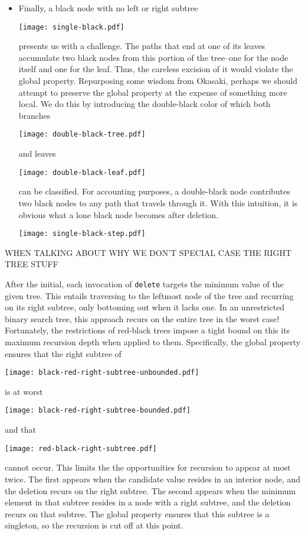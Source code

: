 \documentclass[preprint]{sigplanconf}
\begin{document}
\begin{itemize}
\item Finally, a black node with no left or right subtree
\begin{center}
\texttt{[image: single-black.pdf]}
\end{center}
presents us with a challenge. The paths that end at one of its leaves accumulate two black nodes from this portion of the tree--one for the node itself and one for the leaf. Thus, the careless excision of it would violate the global property. Repurposing some wisdom from Okasaki, perhaps we should attempt to preserve the global property at the expense of something more local. We do this by introducing the double-black color of which both branches
\begin{center}
\texttt{[image: double-black-tree.pdf]}
\end{center}
and leaves
\begin{center}
\texttt{[image: double-black-leaf.pdf]}
\end{center}
can be classified. For accounting purposes, a double-black node contributes two black nodes to any path that travels through it. With this intuition, it is obvious what a lone black node becomes after deletion. 
\begin{center}
\texttt{[image: single-black-step.pdf]}
\end{center}

\end{itemize}


WHEN TALKING ABOUT WHY WE DON'T SPECIAL CASE THE RIGHT TREE STUFF

After the initial, each invocation of \texttt{delete} targets the minimum value of the given tree. This entails traversing to the leftmost node of the tree and recurring on its right subtree, only bottoming out when it lacks one. In an unrestricted binary search tree, this approach recurs on the entire tree in the worst case! Fortunately, the restrictions of red-black trees impose a tight bound on this its maximum recursion depth when applied to them. Specifically, the global property ensures that the right subtree of
\begin{center}
\texttt{[image: black-red-right-subtree-unbounded.pdf]}
\end{center}
is at worst
\begin{center}
\texttt{[image: black-red-right-subtree-bounded.pdf]}
\end{center}
and that
\begin{center}
\texttt{[image: red-black-right-subtree.pdf]}
\end{center}
cannot occur. This limits the the opportunities for recursion to appear at most twice. The first appears when the candidate value resides in an interior node, and the deletion recurs on the right subtree. The second appears when the minimum element in that subtree resides in a node with a right subtree, and the deletion recurs on that subtree. The global property ensures that this subtree is a singleton, so the recursion is cut off at this point.
\end{document}

